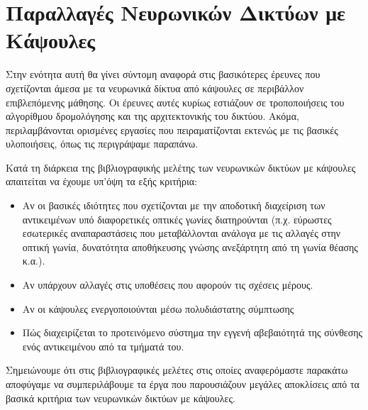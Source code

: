 \section{Παραλλαγές Νευρωνικών Δικτύων με Κάψουλες}

Στην ενότητα αυτή θα γίνει σύντομη αναφορά στις βασικότερες έρευνες που σχετίζονται άμεσα με τα νευρωνικά δίκτυα από κάψουλες σε περιβάλλον επιβλεπόμενης μάθησης. Οι έρευνες αυτές κυρίως εστιάζουν σε τροποποιήσεις του αλγορίθμου δρομολόγησης και της αρχιτεκτονικής του δικτύου. Ακόμα, περιλαμβάνονται ορισμένες εργασίες που πειραματίζονται εκτενώς με τις βασικές υλοποιήσεις, όπως τις περιγράψαμε παραπάνω.\par

Κατά τη διάρκεια της βιβλιογραφικής μελέτης των νευρωνικών δικτύων με κάψουλες απαιτείται να έχουμε υπ'όψη τα εξής κριτήρια:
\begin{itemize}
    \item Αν οι βασικές ιδιότητες που σχετίζονται με την αποδοτική διαχείριση των αντικειμένων υπό διαφορετικές οπτικές γωνίες διατηρούνται (π.χ. εύρωστες εσωτερικές αναπαραστάσεις που μεταβάλλονται ανάλογα με τις αλλαγές στην οπτική γωνία, δυνατότητα αποθήκευσης γνώσης ανεξάρτητη από τη γωνία θέασης κ.α.).
    \item Αν υπάρχουν αλλαγές στις υποθέσεις που αφορούν τις σχέσεις μέρους.
    \item Αν οι κάψουλες ενεργοποιούνται μέσω πολυδιάστατης σύμπτωσης 
    \item Πώς διαχειρίζεται το προτεινόμενο σύστημα την εγγενή αβεβαιότητά της σύνθεσης ενός αντικειμένου από τα τμήματά του. \cite{de2020introducing}
\end{itemize}\par

Σημειώνουμε ότι στις βιβλιογραφικές μελέτες στις οποίες αναφερόμαστε παρακάτω αποφύγαμε να συμπεριλάβουμε τα έργα που παρουσιάζουν μεγάλες αποκλίσεις από τα βασικά κριτήρια των νευρωνικών δικτύων με κάψουλες.\par

\subsubsection{}

